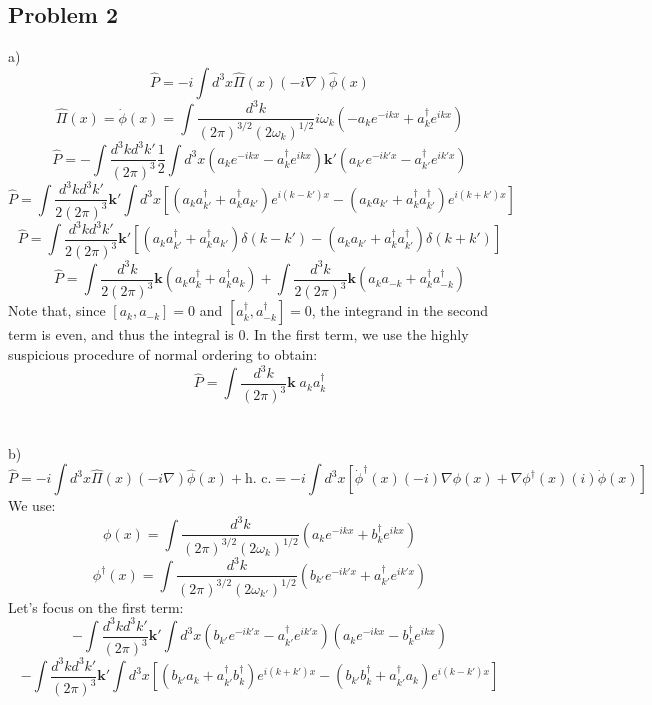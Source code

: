 \documentclass[12 pt]{article}
\begin{document}
\subsection*{Problem 2}
a) \[      \hat P = -i \int d^3 x \hat \Pi (x) ( - i \nabla) \hat \phi(x)        \]
\[         \hat \Pi (x) = \dot \phi (x) = \int \frac{d^3 k}{(2\pi)^{3/2} (2\omega_k)^{1/2}} i \omega_k \left( -  a_k e^{-ikx} + a_k^{\dagger} e^{ikx}  \right)       \]
\[      \hat P = - \int \frac{d^3 k d^3 k'}{(2\pi)^3}  \frac{1}{2}   \int d^3 x \left(  a_k e^{-ikx} - a_k^{\dagger} e^{ikx}  \right) \mathbf{k'} \left(  a_{k'} e^{-ik'x} - a_{k'}^{\dagger} e^{ik'x}  \right)   \]
\[        \hat P =   \int \frac{d^3 k d^3 k'}{2 (2\pi)^3} \mathbf{k'} \int d^3 x \left[ (a_k a_{k'}^{\dagger} + a_k^{\dagger} a_{k'} ) e^{i(k-k')x} - (a_k a_{k'} + a_k^{\dagger} a_{k'}^{\dagger} ) e^{i(k+k')x} \right]   \]
\[        \hat P = \int  \frac{d^3 k d^3 k'}{2 (2\pi)^3} \mathbf{k'} \left[  (a_k a_{k'}^{\dagger} + a_k^{\dagger} a_{k'} ) \delta(k-k') - (a_k a_{k'} + a_k^{\dagger} a_{k'}^{\dagger} ) \delta(k+k')    \right]        \]
\[          \hat P = \int   \frac{d^3 k}{2 (2\pi)^3} \mathbf{k}   (a_k a_{k}^{\dagger} + a_k^{\dagger} a_{k} )  + \int  \frac{d^3 k}{2 (2\pi)^3} \mathbf{k}  (a_k a_{-k} + a_k^{\dagger} a_{-k}^{\dagger} )      \]
Note that, since $[a_k, a_{-k}] = 0$ and $[a_k^{\dagger} , a_{-k}^{\dagger} ] = 0$, the integrand in the second term is even, and thus the integral is 0. In the first term, we use the highly suspicious procedure of normal ordering to obtain:
\[        \hat P =     \int   \frac{d^3 k}{ (2\pi)^3} \mathbf{k} \;  a_k a_{k}^{\dagger}      \]
\\
\\
b) \[        \hat P = -i \int d^3 x \hat \Pi(x) (-i \nabla) \hat \phi(x) + \text{h. c.}  = -i \int d^3 x \left[   \dot \phi^{\dagger}(x) (-i) \nabla \phi(x) + \nabla \phi^{\dagger} (x) (i) \dot \phi(x)  \right]   \]
We use:
\[         \phi(x) = \int \frac{d^3 k}{(2\pi)^{3/2} (2\omega_k)^{1/2}} \left(  a_k e^{-ikx} + b_k^{\dagger} e^{ikx}  \right)   \]
\[         \phi^{\dagger} (x) = \int \frac{d^3 k}{(2\pi)^{3/2} (2\omega_{k'})^{1/2}} \left(  b_{k'} e^{-ik'x} + a_{k'}^{\dagger} e^{ik'x}  \right)                        \]
Let's focus on the first term:
\[      -  \int \frac{d^3 k d^3 k'}{(2\pi)^3 }  \mathbf{k'} \int d^3 x (b_{k'} e^{-ik'x} - a_{k'}^{\dagger} e^{ik'x}) (  a_k e^{-ikx} - b_k^{\dagger} e^{ikx} )   \]
\[  -  \int \frac{d^3 k d^3 k'}{(2\pi)^3 }  \mathbf{k'} \int d^3 x \left[   (b_{k'}a_k + a_{k'}^{\dagger}b_k^{\dagger}) e^{i(k+k')x} - (b_{k'} b_k^{\dagger} + a_{k'}^{\dagger} a_k) e^{i(k-k') x}  \right]              \]
\end{document}

